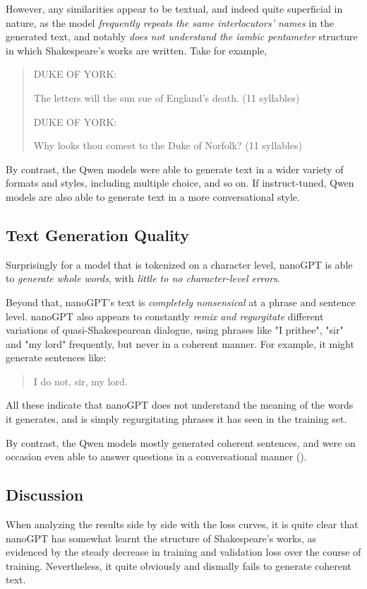 \documentclass{article} %
\theoremstyle{definition}
\begin{document}
However, any similarities appear to be textual, and indeed quite superficial in nature,
as the model \textit{frequently repeats the same interlocutors' names} in the generated text,
and notably \textit{does not understand the iambic pentameter} structure in which Shakespeare's 
works are written. Take for example,
\begin{quote}
DUKE OF YORK:

The letters will the sun sue of England's death. (11 syllables)

DUKE OF YORK:

Why looks thou comest to the Duke of Norfolk? (11 syllables)
\end{quote}


By contrast, the Qwen models were able to generate text in a wider variety of formats
and styles, including multiple choice, and so on. If instruct-tuned, Qwen models
are also able to generate text in a more conversational style.

\subsection{Text Generation Quality}
Surprisingly for a model that is tokenized on a character level,
nanoGPT is able to \textit{generate whole words}, with \textit{little to no character-level errors}.

Beyond that, nanoGPT's text is \textit{completely nonsensical} at a phrase and sentence level.
nanoGPT also appears to constantly \textit{remix and regurgitate} different variations
of quasi-Shakespearean dialogue, using phrases like "I prithee", "sir" and "my lord" frequently,
but never in a coherent manner. For example, it might generate sentences like:
\begin{quote}
    I do not, sir, my lord. 
\end{quote}

All these indicate that nanoGPT does not understand the meaning of the words it generates,
and is simply regurgitating phrases it has seen in the training set.

By contrast, the Qwen models mostly generated coherent sentences,
and were on occasion even able to answer questions in a conversational manner (\cite{beh-2025-b}).

\subsection{Discussion}
When analyzing the results side by side with the loss curves,
it is quite clear that nanoGPT has somewhat learnt the structure of Shakespeare's works,
as evidenced by the steady decrease in training and validation loss
over the course of training. Nevertheless, it quite obviously and dismally fails 
to generate coherent text.
\end{document}
